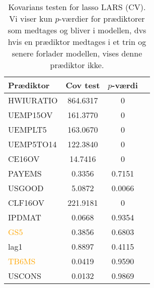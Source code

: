\begin{table}[ht] 
\centering 
\begin{tabular}{lccc}
\toprule
Prædiktor & Cov test & \(p\)-værdi \\
\midrule
 \textcolor{blue3}{HWIURATIO}  &   864.6317 & 0 \\
 \textcolor{blue3}{UEMP15OV}  &   161.3770&  0 \\
 \textcolor{blue3}{UEMPLT5} &  163.0670 & 0 \\
 \textcolor{blue3}{UEMP5TO14}  &   122.3840  &0 \\
 \textcolor{blue3}{CE16OV} & 14.7416  &0 \\
 \textcolor{blue3}{PAYEMS} &  0.3356  &0.7151 \\
  \textcolor{blue3}{USGOOD}  &   5.0872 & 0.0066 \\
 \textcolor{blue3}{CLF16OV}    &   221.9181 & 0 \\
\textcolor{chartreuse4}{IPDMAT}       &    0.0668&  0.9354 \\
\textcolor{orange}{GS5}   &       0.3856 &    0.6803 \\
 \textcolor{blue3}{ lag1 }  &      0.8897 &    0.4115 \\
\textcolor{orange}{ TB6MS }&       0.0419   &  0.9590 \\
 \textcolor{blue3}{USCONS }&   0.0132   &  0.9869 \\ 
\bottomrule
\end{tabular}

\caption{Kovarians testen for lasso LARS (CV).
Vi viser kun \(p\)-værdier for prædiktorer som medtages og bliver i modellen, dvs hvis en prædiktor medtages i et trin og senere forlader modellen, vises denne prædiktor ikke.} \label{tab:covTest}
\end{table} 
